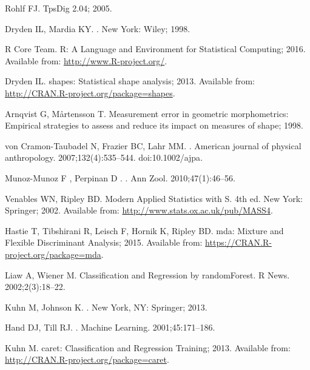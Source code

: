 \documentclass[10pt,letterpaper]{article}
\begin{document}
\begin{thebibliography}{10}
  Rohlf FJ. {TpsDig 2.04}; 2005.

  Dryden IL, Mardia KY.
.
\newblock New York: Wiley; 1998.

  {R Core Team}. R: A Language and Environment for Statistical Computing; 2016.
\newblock Available from: \url{http://www.R-project.org/}.

  Dryden IL. shapes: Statistical shape analysis; 2013.
\newblock Available from: \url{http://CRAN.R-project.org/package=shapes}.

  Arnqvist G, M{\aa}rtensson T. {Measurement error in geometric morphometrics:
  Empirical strategies to assess and reduce its impact on measures of shape};
  1998.

  von Cramon-Taubadel N, Frazier BC, Lahr MM.
.
\newblock American journal of physical anthropology. 2007;132(4):535--544.
\newblock doi:{10.1002/ajpa}.

  {Munoz-Munoz F }, {Perpinan D }.
.
\newblock Ann Zool. 2010;47(1):46--56.

  Venables WN, Ripley BD.
\newblock Modern Applied Statistics with S.
\newblock 4th ed. New York: Springer; 2002.
\newblock Available from: \url{http://www.stats.ox.ac.uk/pub/MASS4}.

  Hastie T, Tibshirani R, Leisch F, Hornik K, Ripley BD. mda: Mixture and
  Flexible Discriminant Analysis; 2015.
\newblock Available from: \url{https://CRAN.R-project.org/package=mda}.

  Liaw A, Wiener M.
\newblock Classification and Regression by randomForest.
\newblock R News. 2002;2(3):18--22.

  Kuhn M, Johnson K.
.
\newblock New York, NY: Springer; 2013.

  Hand DJ, Till RJ.
.
\newblock Machine Learning. 2001;45:171--186.

  Kuhn M. caret: Classification and Regression Training; 2013.
\newblock Available from: \url{http://CRAN.R-project.org/package=caret}.


\end{thebibliography}
\end{document}

